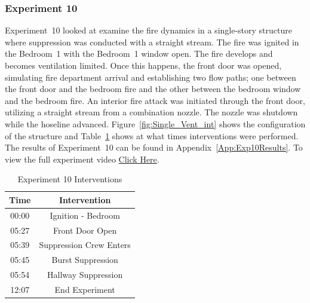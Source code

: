 \documentclass[12pt,oneside]{book}
\begin{document}
\subsubsection{Experiment 10}
Experiment~10 looked at examine the fire dynamics in a single-story structure where suppression was conducted with a straight stream. The fire was ignited in the Bedroom~1 with the Bedroom~1 window open. The fire develops and becomes ventilation limited. Once this happens, the front door was opened, simulating fire department arrival and establishing two flow paths; one between the front door and the bedroom fire and the other between the bedroom window and the bedroom fire. An interior fire attack was initiated through the front door, utilizing a straight stream from a combination nozzle. The nozzle was shutdown while the hoseline advanced. Figure~\ref{fig:Single_Vent_int} shows the configuration of the structure and Table~\ref{Table:Exp10Interventions} shows at what times interventions were performed. The results of Experiment~10 can be found in Appendix~\ref{App:Exp10Results}. To view the full experiment video \href{https://player.vimeo.com/video/170510939?autoplay=1}{Click Here}.

\begin{table}[H]
	\centering
	\caption{Experiment 10 Interventions}
	\begin{tabular}{|c|c|} 
		\hline
		Time & Intervention \\ \hline \hline
		00:00 & Ignition - Bedroom \\ \hline
		05:27 & Front Door Open \\ \hline
		05:39 & Suppression Crew Enters\\ \hline
		05:45 & Burst Suppression \\ \hline 
		05:54 & Hallway Suppression \\ \hline
		12:07 & End Experiment\\ \hline
	\end{tabular}
	\label{Table:Exp10Interventions}
\end{table}

\FloatBarrier
\end{document}
